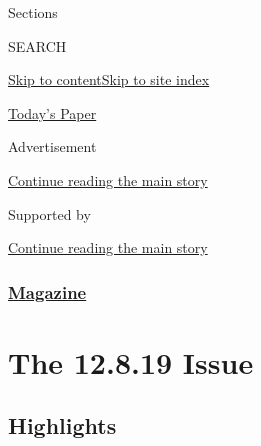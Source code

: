 Sections

SEARCH

\protect\hyperlink{site-content}{Skip to
content}\protect\hyperlink{site-index}{Skip to site index}

\href{https://myaccount.nytimes3xbfgragh.onion/auth/login?response_type=cookie\&client_id=vi}{}

\href{https://www.nytimes3xbfgragh.onion/section/todayspaper}{Today's
Paper}

Advertisement

\protect\hyperlink{after-top}{Continue reading the main story}

Supported by

\protect\hyperlink{after-sponsor}{Continue reading the main story}

\hypertarget{magazine}{%
\subsubsection{\texorpdfstring{\href{/section/magazine}{Magazine}}{Magazine}}\label{magazine}}

\hypertarget{the-12819-issue}{%
\section{The 12.8.19 Issue}\label{the-12819-issue}}

\hypertarget{highlights}{%
\subsection{Highlights}\label{highlights}}

